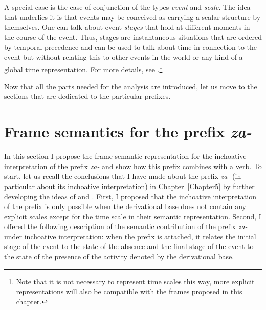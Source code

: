 A special case is the case of conjunction of the types \textit{event} and \textit{scale}. The idea that underlies it is that events may be conceived as carrying a scalar structure by themselves. One can talk about event \emph{stages} that hold at different moments in the course of the event. Thus, stages are instantaneous situations that are ordered by temporal precedence and can be used to talk about time in connection to the event but without relating this to other events in the world or any kind of a global time representation. For more details, see \citet{ZinovaOsswald:paper}.\footnote{Note that it is not necessary to represent time scales this way, more explicit representations will also be compatible with the frames proposed in this chapter.}

Now that all the parts needed for the analysis are introduced, let us move to the sections that are dedicated to the particular prefixes.

\section{Frame semantics for the prefix \textit{za-}}\label{section:frame:za}
In this section I propose the frame semantic representation for the inchoative interpretation of the prefix \textit{za-} and show how this prefix combines with a verb. To start, let us recall the conclusions that I have made about the prefix \textit{za-} (in particular about its inchoative interpretation) in Chapter~\ref{Chapter5} by further developing the ideas of \citet{Braginsky:08} and \citet{Kagan:book}. First, I proposed that the inchoative interpretation of the prefix is only possible when the derivational base does not contain any explicit scales except for the time scale in their semantic representation. Second, I offered the following description of the semantic contribution of the prefix \textit{za-} under inchoative interpretation: when the prefix is attached, it relates the initial stage of the event to the state of the absence and the final stage of the event to the state of the presence of the activity denoted by the derivational base.

